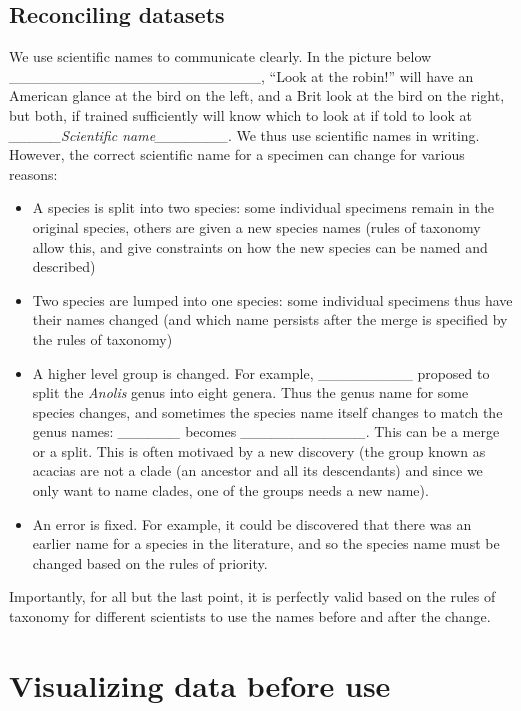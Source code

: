 \documentclass[]{book}
\providecommand{\tightlist}{%
  \setlength{\itemsep}{0pt}\setlength{\parskip}{0pt}}
\theoremstyle{definition}
\theoremstyle{definition}
\theoremstyle{remark}
\begin{document}
\section{Reconciling datasets}\label{reconciling-datasets}

We use scientific names to communicate clearly. In the picture below
\_\_\_\_\_\_\_\_\_\_\_\_\_\_\_\_\_\_\_\_\_\_\_\_, ``Look at the robin!''
will have an American glance at the bird on the left, and a Brit look at
the bird on the right, but both, if trained sufficiently will know which
to look at if told to look at \emph{\_\_\_\_\_Scientific
name\_\_\_\_\_\_\_}. We thus use scientific names in writing. However,
the correct scientific name for a specimen can change for various
reasons:

\begin{itemize}
\tightlist
\item
  A species is split into two species: some individual specimens remain
  in the original species, others are given a new species names (rules
  of taxonomy allow this, and give constraints on how the new species
  can be named and described)
\item
  Two species are lumped into one species: some individual specimens
  thus have their names changed (and which name persists after the merge
  is specified by the rules of taxonomy)
\item
  A higher level group is changed. For example, \_\_\_\_\_\_\_\_\_
  proposed to split the \emph{Anolis} genus into eight genera. Thus the
  genus name for some species changes, and sometimes the species name
  itself changes to match the genus names: \emph{\_\_\_\_\_\_} becomes
  \emph{\_\_\_\_\_\_\_\_\_\_\_\_}. This can be a merge or a split. This
  is often motivaed by a new discovery (the group known as acacias are
  not a clade (an ancestor and all its descendants) and since we only
  want to name clades, one of the groups needs a new name).
\item
  An error is fixed. For example, it could be discovered that there was
  an earlier name for a species in the literature, and so the species
  name must be changed based on the rules of priority.
\end{itemize}

Importantly, for all but the last point, it is perfectly valid based on
the rules of taxonomy for different scientists to use the names before
and after the change.

\chapter{Visualizing data before use}\label{visualizing-data-before-use}
\end{document}
